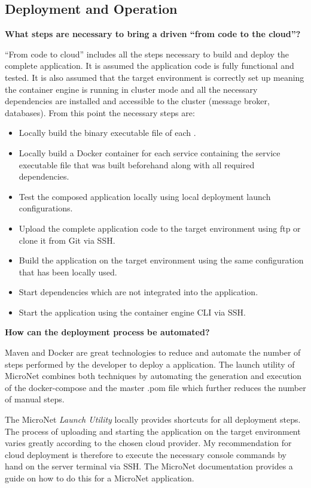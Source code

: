 \subsection{Deployment and Operation}

\noindent
\textbf{What steps are necessary to bring a \ms{} driven \og{} ``from code to
the cloud''?}

``From code to cloud'' includes all the steps necessary to build and deploy the
complete \ms{} \og{} application. It is assumed the application code is
fully functional and tested. It is also assumed that the target environment is
correctly set up meaning the container engine is running in cluster mode and all
the necessary dependencies are installed and accessible to the cluster (message
broker, databases). From this point the necessary steps are:

\begin{itemize}
  \item Locally build the binary executable file of each \ms{}.
  \item Locally build a Docker container for each service containing the service
  executable file that was built beforehand along with all required dependencies.
  \item Test the composed application locally using local deployment launch
  configurations.
  \item Upload the complete application code to the target environment using ftp
  or clone it from Git via SSH.
  \item Build the application on the target environment using the same
  configuration that has been locally used.
  \item Start dependencies which are not integrated into the application.
  \item Start the application using the container engine CLI via SSH.
\end{itemize}

\noindent
\textbf{How can the deployment process be automated?}

Maven and Docker are great technologies to reduce and automate the number of
steps performed by the developer to deploy a \ms{} application. The launch
utility of MicroNet combines both techniques by automating the generation and
execution of the docker-compose and the master .pom file which further reduces
the number of manual steps.

The MicroNet \textit{Launch Utility} locally provides shortcuts for all
deployment steps. The process of uploading and starting the application on the
target environment varies greatly according to the chosen cloud provider. My
recommendation for cloud deployment is therefore to execute the necessary
console commands by hand on the server terminal via SSH. The MicroNet
documentation provides a guide on how to do this \cite{micronet2017doku} for a
MicroNet application.\\

